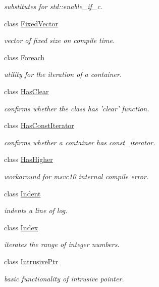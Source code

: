 \begin{DoxyCompactItemize}
\begin{DoxyCompactList}\small\item\em substitutes for std\-::enable\-\_\-if\-\_\-c. \end{DoxyCompactList}\item 
class \hyperlink{classhryky_1_1_fixed_vector}{Fixed\-Vector}
\begin{DoxyCompactList}\small\item\em vector of fixed size on compile time. \end{DoxyCompactList}\item 
class \hyperlink{classhryky_1_1_foreach}{Foreach}
\begin{DoxyCompactList}\small\item\em utility for the iteration of a container. \end{DoxyCompactList}\item 
class \hyperlink{classhryky_1_1_has_clear}{Has\-Clear}
\begin{DoxyCompactList}\small\item\em confirms whether the class has 'clear' function. \end{DoxyCompactList}\item 
class \hyperlink{classhryky_1_1_has_const_iterator}{Has\-Const\-Iterator}
\begin{DoxyCompactList}\small\item\em confirms whether a container has const\-\_\-iterator. \end{DoxyCompactList}\item 
class \hyperlink{classhryky_1_1_has_higher}{Has\-Higher}
\begin{DoxyCompactList}\small\item\em workaround for msvc10 internal compile error. \end{DoxyCompactList}\item 
class \hyperlink{classhryky_1_1_indent}{Indent}
\begin{DoxyCompactList}\small\item\em indents a line of log. \end{DoxyCompactList}\item 
class \hyperlink{classhryky_1_1_index}{Index}
\begin{DoxyCompactList}\small\item\em iterates the range of integer numbers. \end{DoxyCompactList}\item 
class \hyperlink{classhryky_1_1_intrusive_ptr}{Intrusive\-Ptr}
\begin{DoxyCompactList}\small\item\em basic functionality of intrusive pointer. \end{DoxyCompactList}\item 

\end{DoxyCompactItemize}
